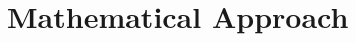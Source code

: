 \documentclass[../main.tex]{subfiles}
\begin{document}
\section{Mathematical Approach}\label{sec:math}
\end{document}
